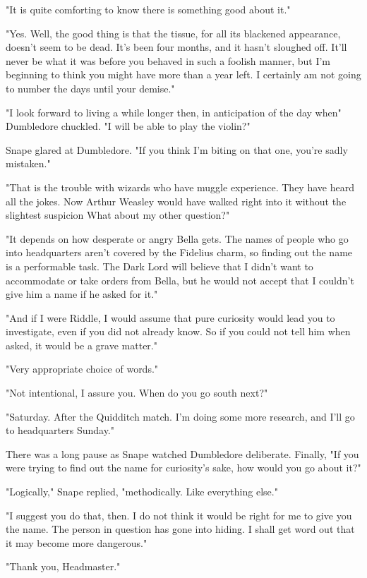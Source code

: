 "It is quite comforting to know there is something good about it."

"Yes. Well, the good thing is that the tissue, for all its blackened appearance, doesn't seem to be dead. It's been four months, and it hasn't sloughed off. It'll never be what it was before you behaved in such a foolish manner, but I'm beginning to think you might have more than a year left. I certainly am not going to number the days until your demise."

"I look forward to living a while longer then, in anticipation of the day when{\el}" Dumbledore chuckled. "I will be able to play the violin?"

Snape glared at Dumbledore. "If you think I'm biting on that one, you're sadly mistaken."

"That is the trouble with wizards who have muggle experience. They have heard all the jokes. Now Arthur Weasley would have walked right into it without the slightest suspicion{\el} What about my other question?"

"It depends on how desperate or angry Bella gets. The names of people who go into headquarters aren't covered by the Fidelius charm, so finding out the name is a performable task. The Dark Lord will believe that I didn't want to accommodate or take orders from Bella, but he would not accept that I couldn't give him a name if he asked for it."

"And if I were Riddle, I would assume that pure curiosity would lead you to investigate, even if you did not already know. So if you could not tell him when asked, it would be a grave matter."

"Very appropriate choice of words."

"Not intentional, I assure you. When do you go south next?"

"Saturday. After the Quidditch match. I'm doing some more research, and I'll go to headquarters Sunday."

There was a long pause as Snape watched Dumbledore deliberate. Finally, "If you were trying to find out the name for curiosity's sake, how would you go about it?"

"Logically," Snape replied, "methodically. Like everything else."

"I suggest you do that, then. I do not think it would be right for me to give you the name. The person in question has gone into hiding. I shall get word out that it may become more dangerous."

"Thank you, Headmaster."

